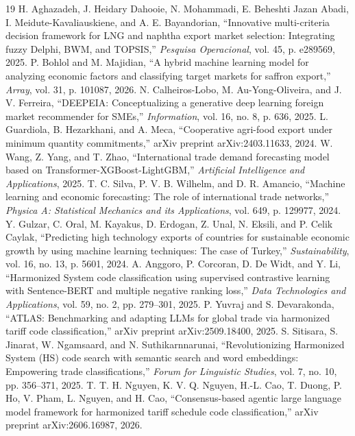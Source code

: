 \documentclass[conference]{IEEEtran}
\begin{document}
\begin{thebibliography}{19}
 H. Aghazadeh, J. Heidary Dahooie, N. Mohammadi, E. Beheshti Jazan Abadi, I. Meidute-Kavaliauskiene, and A. E. Bayandorian, ``Innovative multi-criteria decision framework for LNG and naphtha export market selection: Integrating fuzzy Delphi, BWM, and TOPSIS,'' \emph{Pesquisa Operacional}, vol. 45, p. e289569, 2025.
 P. Bohlol and M. Majidian, ``A hybrid machine learning model for analyzing economic factors and classifying target markets for saffron export,'' \emph{Array}, vol. 31, p. 101087, 2026.
 N. Calheiros-Lobo, M. Au-Yong-Oliveira, and J. V. Ferreira, ``DEEPEIA: Conceptualizing a generative deep learning foreign market recommender for SMEs,'' \emph{Information}, vol. 16, no. 8, p. 636, 2025.
 L. Guardiola, B. Hezarkhani, and A. Meca, ``Cooperative agri-food export under minimum quantity commitments,'' arXiv preprint arXiv:2403.11633, 2024.
 W. Wang, Z. Yang, and T. Zhao, ``International trade demand forecasting model based on Transformer-XGBoost-LightGBM,'' \emph{Artificial Intelligence and Applications}, 2025.
 T. C. Silva, P. V. B. Wilhelm, and D. R. Amancio, ``Machine learning and economic forecasting: The role of international trade networks,'' \emph{Physica A: Statistical Mechanics and its Applications}, vol. 649, p. 129977, 2024.
 Y. Gulzar, C. Oral, M. Kayakus, D. Erdogan, Z. Unal, N. Eksili, and P. Celik Caylak, ``Predicting high technology exports of countries for sustainable economic growth by using machine learning techniques: The case of Turkey,'' \emph{Sustainability}, vol. 16, no. 13, p. 5601, 2024.
 A. Anggoro, P. Corcoran, D. De Widt, and Y. Li, ``Harmonized System code classification using supervised contrastive learning with Sentence-BERT and multiple negative ranking loss,'' \emph{Data Technologies and Applications}, vol. 59, no. 2, pp. 279--301, 2025.
 P. Yuvraj and S. Devarakonda, ``ATLAS: Benchmarking and adapting LLMs for global trade via harmonized tariff code classification,'' arXiv preprint arXiv:2509.18400, 2025.
 S. Sitisara, S. Jinarat, W. Ngamsaard, and N. Suthikarnnarunai, ``Revolutionizing Harmonized System (HS) code search with semantic search and word embeddings: Empowering trade classifications,'' \emph{Forum for Linguistic Studies}, vol. 7, no. 10, pp. 356--371, 2025.
 T. T. H. Nguyen, K. V. Q. Nguyen, H.-L. Cao, T. Duong, P. Ho, V. Pham, L. Nguyen, and H. Cao, ``Consensus-based agentic large language model framework for harmonized tariff schedule code classification,'' arXiv preprint arXiv:2606.16987, 2026.

\end{thebibliography}
\end{document}
